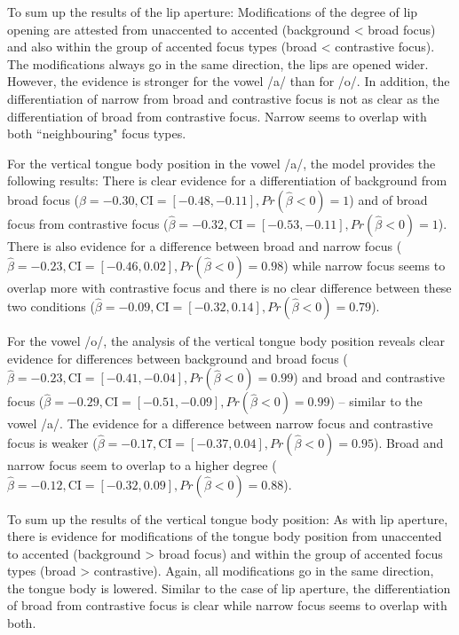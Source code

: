To sum up the results of the lip aperture: Modifications of the degree of lip opening are attested from unaccented to accented (background < broad focus) and also within the group of accented focus types (broad < contrastive focus). The modifications always go in the same direction, the lips are opened wider. However, the evidence is stronger for the vowel /a/ than for /o/. In addition, the differentiation of narrow from broad and contrastive focus is not as clear as the differentiation of broad from contrastive focus. Narrow seems to overlap with both ``neighbouring" focus types.

For the vertical tongue body position in the vowel /a/, the model provides the following results: There is clear evidence for a differentiation of background from broad focus ($\hat\beta=-0.30 , \text{CI}=[-0.48, -0.11], \allowbreak Pr(\hat\beta<0)=1$) and of broad focus from contrastive focus ($\hat\beta=-0.32 , \text{CI}=[-0.53, -0.11], \allowbreak Pr(\hat\beta<0)=1$). There is also evidence for a difference between broad and narrow focus ($\hat\beta=-0.23 , \text{CI}=[-0.46, 0.02], \allowbreak Pr(\hat\beta<0)=0.98$) while narrow focus seems to overlap more with contrastive focus and there is no clear difference between these two conditions ($\hat\beta=-0.09 , \text{CI}=[-0.32, 0.14], \allowbreak Pr(\hat\beta<0)=0.79$).

For the vowel /o/, the analysis of the vertical tongue body position reveals clear evidence for differences between background and broad focus ($\hat\beta=-0.23, \text{CI}=[-0.41, -0.04], \allowbreak Pr(\hat\beta<0)=0.99$) and broad and contrastive focus ($\hat\beta = -0.29 , \text{CI}=[-0.51, -0.09], \allowbreak Pr(\hat\beta<0)=0.99$) -- similar to the vowel /a/. The evidence for a difference between narrow focus and contrastive focus is weaker ($\hat\beta=-0.17, \text{CI}=[-0.37, 0.04], \allowbreak Pr(\hat\beta<0)=0.95$). Broad and narrow focus seem to overlap to a higher degree ($\hat\beta=-0.12, \text{CI}=[-0.32, 0.09], \allowbreak Pr(\hat\beta<0)=0.88$).

To sum up the results of the vertical tongue body position: As with lip aperture, there is evidence for modifications of the tongue body position from unaccented to accented (background > broad focus) and within the group of accented focus types (broad > contrastive). Again, all modifications go in the same direction, the tongue body is lowered. Similar to the case of lip aperture, the differentiation of broad from contrastive focus is clear while narrow focus seems to overlap with both.

